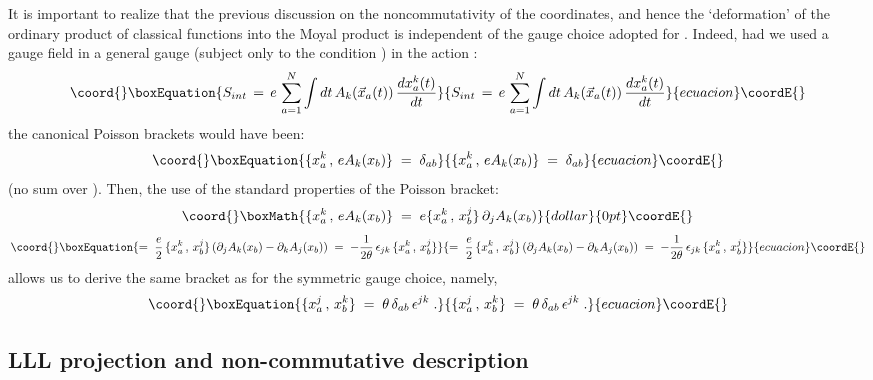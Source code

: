 \documentclass[a4paper,12pt]{article}
\begin{document}
It is important to realize that the previous discussion on the
noncommutativity of the coordinates, and hence the `deformation' of
the ordinary product of classical functions into the Moyal product
is
independent of the gauge choice adopted for \coordHE{}. Indeed, had we
used
a gauge field in a general gauge (subject only to the condition
\coordHE{}) in the action \coordHE{}:
\begin{equation}\coord{}\boxEquation{
  \label{eq:gensint}
S_{int} \,=\, e\, \sum_{a=1}^N \int dt \,A_k({\vec x}_a (t))\,
\frac{dx^k_a(t)}{dt} 
}{
  S_{int} \,=\, e\, \sum_{a=1}^N \int dt \,A_k({\vec x}_a (t))\,
\frac{dx^k_a(t)}{dt} 
}{ecuacion}\coordE{}\end{equation}
the canonical Poisson brackets would have been:
\begin{equation}\coord{}\boxEquation{
  \label{eq:gensint1}
  \{ x_a^k \,,\, e A_k (x_b) \} \;=\; \delta_{ab}  
}{
  \{ x_a^k \,,\, e A_k (x_b) \} \;=\; \delta_{ab}  
}{ecuacion}\coordE{}\end{equation}
(no sum over \coordHE{}). Then, the use of the standard properties of the
Poisson bracket:
$$\coord{}\boxMath{
\{ x^k_a \,,\, e A_k(x_b) \} \;=\; e \{ x^k_a \,,\,x^j_b
\}\,\partial_j
A_k(x_b)
}{dollar}{0pt}\coordE{}$$
\begin{equation}\coord{}\boxEquation{
  \label{eq:gensint2}
=\;\frac{e}{2} \,\{ x^k_a \,,\,x^j_b \}\,(\partial_j A_k(x_b) -
\partial_k A_j(x_b)) 
\;=\; -\frac{1}{2\theta} \,\epsilon_{jk}\, \{ x^k_a \,,\,x^j_b \} 
}{
  =\;\frac{e}{2} \,\{ x^k_a \,,\,x^j_b \}\,(\partial_j A_k(x_b) -
\partial_k A_j(x_b)) 
\;=\; -\frac{1}{2\theta} \,\epsilon_{jk}\, \{ x^k_a \,,\,x^j_b \} 
}{ecuacion}\coordE{}\end{equation}
allows us to derive the same bracket as for the symmetric gauge
choice, namely,
\begin{equation}\coord{}\boxEquation{
  \label{eq:cpb}
\{ x^j_a \,,\, x^k_b \} \;=\; \theta \, \delta_{ab}\, \epsilon^{jk}
\;.
}{
  \{ x^j_a \,,\, x^k_b \} \;=\; \theta \, \delta_{ab}\, \epsilon^{jk}
\;.
}{ecuacion}\coordE{}\end{equation}



\subsection{LLL projection and non-commutative description}
\end{document}
